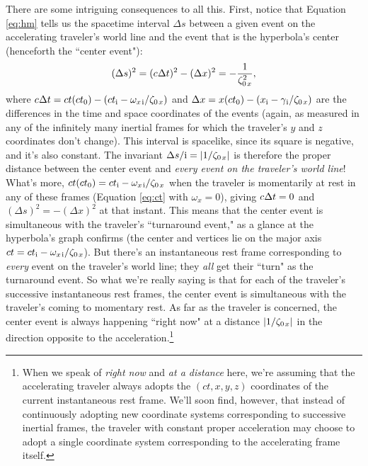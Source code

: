 \documentclass[12pt]{article}
\begin{document}
There are some intriguing consequences to all this. First, notice that Equation \ref{eq:hm} tells us the spacetime interval $\Delta s$ between a given event on the accelerating traveler's world line and the event that is the hyperbola's center (henceforth the ``center event"):
\begin{equation*}
(\Delta s)^2 = (c \mkern.5mu \Delta t)^2 - (\Delta x)^2 = - \dfrac{1}{ \zeta^2_{0 \mkern2mu x}},
\end{equation*}
where $c \mkern.5mu \Delta t = ct(ct_0) - (ct_{\mathrm{i}} - \omega_{x \mkern2mu \textrm{i} } / \zeta_{0 \mkern2mu x})$ and $\Delta x = x(ct_0) - (x_{\mathrm{i}} - \gamma_{\mkern1mu \mathrm{i}} / \zeta_{0 \mkern2mu x})$ are the differences in the time and space coordinates of the events (again, as measured in any of the infinitely many inertial frames for which the traveler's $y$ and $z$ coordinates don't change). This interval is spacelike, since its square is negative, and it's also constant. The invariant $\Delta s / \mathrm{i} = |1 / \zeta_{0 \mkern2mu x}|$ is therefore the proper distance between the center event and \emph{every event on the traveler's world line}! What's more, $ct(ct_0) = ct_{\mathrm{i}} - \omega_{x \mkern2mu \textrm{i} } / \zeta_{0 \mkern2mu x}$ when the traveler is momentarily at rest in any of these frames (Equation \ref{eq:ct} with $\omega_x = 0$), giving $c \mkern.5mu \Delta t = 0$ and $(\Delta s)^2 = - (\Delta x)^2$ at that instant. This means that the center event is simultaneous with the traveler's ``turnaround event," as a glance at the hyperbola's graph confirms (the center and vertices lie on the major axis $ct = ct_{\mathrm{i}} - \omega_{x \mkern2mu \textrm{i} } / \zeta_{0 \mkern2mu x}$). But there's an instantaneous rest frame corresponding to \emph{every} event on the traveler's world line; they \emph{all} get their ``turn" as the turnaround event. So what we're really saying is that for each of the traveler's successive instantaneous rest frames, the center event is simultaneous with the traveler's coming to momentary rest. As far as the traveler is concerned, the center event is always happening ``right now" at a distance $|1 / \zeta_{0 \mkern2mu x}|$ in the direction opposite to the acceleration.\footnote{When we speak of \emph{right now} and \emph{at a distance} here, we're assuming that the accelerating traveler always adopts the $(ct, x, y, z)$ coordinates of the current instantaneous rest frame. We'll soon find, however, that instead of continuously adopting new coordinate systems corresponding to successive inertial frames, the traveler with constant proper acceleration may choose to adopt a single coordinate system corresponding to the accelerating frame itself.}
\end{document}
